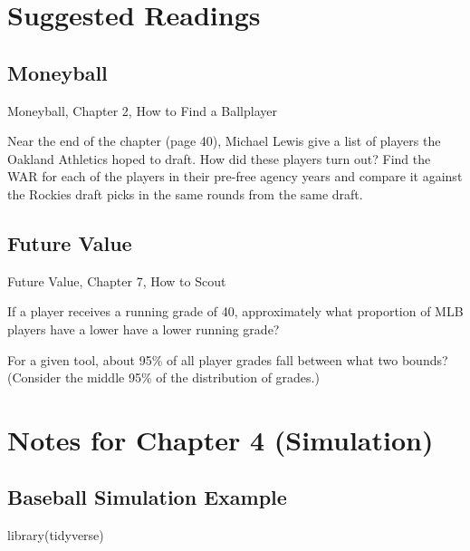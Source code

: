 \documentclass[
]{book}
\newenvironment{Shaded}{\begin{snugshade}}{\end{snugshade}}
\newcommand{\FunctionTok}[1]{\textcolor[rgb]{0.00,0.00,0.00}{#1}}
\newcommand{\NormalTok}[1]{#1}
\theoremstyle{definition}
\theoremstyle{definition}
\theoremstyle{definition}
\theoremstyle{definition}
\theoremstyle{remark}
\begin{document}
\hypertarget{suggested-readings}{%
\section{Suggested Readings}\label{suggested-readings}}

\hypertarget{moneyball}{%
\subsection{Moneyball}\label{moneyball}}

Moneyball, Chapter 2, How to Find a Ballplayer \citep{lewis2004moneyball}

Near the end of the chapter (page 40), Michael Lewis give a list of players the Oakland Athletics hoped to draft. How did these players turn out? Find the WAR for each of the players in their pre-free agency years and compare it against the Rockies draft picks in the same rounds from the same draft.

\hypertarget{future-value}{%
\subsection{Future Value}\label{future-value}}

Future Value, Chapter 7, How to Scout \citep{longenhagen2020future}

If a player receives a running grade of 40, approximately what proportion of MLB players have a lower have a lower running grade?

For a given tool, about 95\% of all player grades fall between what two bounds? (Consider the middle 95\% of the distribution of grades.)

\hypertarget{notes-for-chapter-4-simulation}{%
\section{Notes for Chapter 4 (Simulation)}\label{notes-for-chapter-4-simulation}}

\hypertarget{baseball-simulation-example}{%
\subsection{Baseball Simulation Example}\label{baseball-simulation-example}}

\begin{Shaded}
\begin{Highlighting}[]
\FunctionTok{library}\NormalTok{(tidyverse)}
\end{Highlighting}
\end{Shaded}
\end{document}
